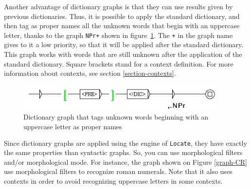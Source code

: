 \bigskip
\noindent Another advantage of dictionary graphs is that they can use results
given by previous dictionaries. Thus, it is possible to apply the standard dictionary, and then tag as proper
names all the unknown words that begin with an uppercase letter, thanks to the
graph \verb$NPr+$ shown in figure~\ref{graph-NPr}. The \verb$+$ in the graph
name gives to it a low priority, so that it will be applied after the standard
dictionary. This graph works with words that are still unknown after the
application of the standard dictionary. Square brackets stand for a context definition.
For more information about contexts, see section
\ref{section-contexts}.

\begin{figure}[!h]
\begin{center}
\includegraphics[width=10.5cm]{resources/img/fig3-11.png}
\caption{Dictionary graph that tags unknown words beginning with an uppercase letter as proper names\label{graph-NPr}}
\end{center}
\end{figure}

\bigskip
\noindent Since dictionary graphs are applied using the engine of \verb+Locate+,
they have exactly the same properties than syntactic graphs. So,
you can use morphological filters and/or morphological mode.
For instance, the
graph shown on Figure \ref{graph-CR} use morphological filters to recognize
roman numerals. Note that it also uses contexts in order to avoid recognizing 
uppercase letters in some contexts.


